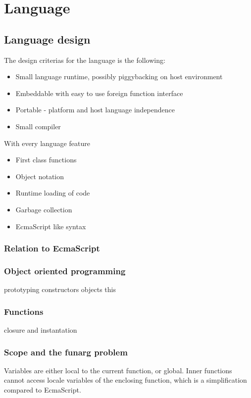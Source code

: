 \chapter{Language}
\section{Language design}


The design criterias for the language is the following:
\begin{itemize}
\item Small language runtime, possibly piggybacking on host environment
\item Embeddable with easy to use foreign function interface
\item Portable - platform and host language independence
\item Small compiler
\end{itemize}




With every language feature

\begin{itemize}
\item First class functions
\item Object notation
\item Runtime loading of code
\item Garbage collection
\item EcmaScript like syntax
\end{itemize}

\subsection{Relation to EcmaScript}

\subsection{Object oriented programming}
prototyping
constructors
objects
this

\subsection{Functions}
closure and instantation

\subsection{Scope and the funarg problem}

Variables are either local to the current function, or global.
Inner functions cannot access locale variables of the enclosing function, which is a simplification compared to EcmaScript.

